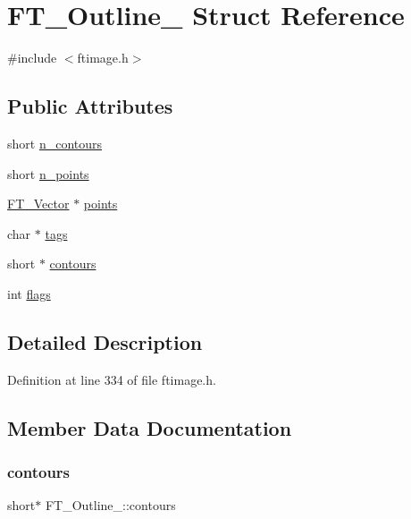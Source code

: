 \hypertarget{struct_f_t___outline__}{}\section{F\+T\+\_\+\+Outline\+\_\+ Struct Reference}
\label{struct_f_t___outline__}


{\ttfamily \#include $<$ftimage.\+h$>$}

\subsection*{Public Attributes}
\begin{DoxyCompactItemize}
\item 
short \mbox{\hyperlink{struct_f_t___outline___a0313ba9c2c51f10e6b7d7ef97bd946e2}{n\+\_\+contours}}
\item 
short \mbox{\hyperlink{struct_f_t___outline___a7ebcf3c33231af88655534d1ac02b66e}{n\+\_\+points}}
\item 
\mbox{\hyperlink{ftimage_8h_ab158b5a7e422acb1968af95db786d018}{F\+T\+\_\+\+Vector}} $\ast$ \mbox{\hyperlink{struct_f_t___outline___a4871896a2f38bdab947e30a7cf6bca04}{points}}
\item 
char $\ast$ \mbox{\hyperlink{struct_f_t___outline___ac84ca66907361e1f49ec11c14720087a}{tags}}
\item 
short $\ast$ \mbox{\hyperlink{struct_f_t___outline___a218fdea14003061142ac1045ac50affa}{contours}}
\item 
int \mbox{\hyperlink{struct_f_t___outline___a149765f0be0eab4fc82410cf853964bf}{flags}}
\end{DoxyCompactItemize}


\subsection{Detailed Description}


Definition at line 334 of file ftimage.\+h.



\subsection{Member Data Documentation}
\mbox{\label{struct_f_t___outline___a218fdea14003061142ac1045ac50affa}} 
\subsubsection{\texorpdfstring{contours}{contours}}
{\footnotesize\ttfamily short$\ast$ F\+T\+\_\+\+Outline\+\_\+\+::contours}



